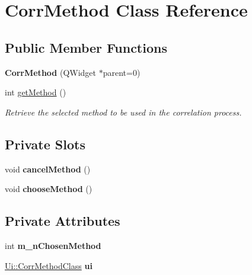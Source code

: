 \hypertarget{classCorrMethod}{
\section{CorrMethod Class Reference}
\label{classCorrMethod}
}
\subsection*{Public Member Functions}
\begin{DoxyCompactItemize}
\item 
\hypertarget{classCorrMethod_abdc14398267291249d40158e133cf68b}{
{\bfseries CorrMethod} (QWidget $\ast$parent=0)}
\label{classCorrMethod_abdc14398267291249d40158e133cf68b}

\item 
int \hyperlink{classCorrMethod_a3eeafdd901560c1fa92be75d4ed58872}{getMethod} ()
\begin{DoxyCompactList}\small\item\em Retrieve the selected method to be used in the correlation process. \item\end{DoxyCompactList}\end{DoxyCompactItemize}
\subsection*{Private Slots}
\begin{DoxyCompactItemize}
\item 
\hypertarget{classCorrMethod_a87e628d7ef6facc9a402880d7e01ea36}{
void {\bfseries cancelMethod} ()}
\label{classCorrMethod_a87e628d7ef6facc9a402880d7e01ea36}

\item 
\hypertarget{classCorrMethod_a7522197ac15c7563aee8d15d0cff3d95}{
void {\bfseries chooseMethod} ()}
\label{classCorrMethod_a7522197ac15c7563aee8d15d0cff3d95}

\end{DoxyCompactItemize}
\subsection*{Private Attributes}
\begin{DoxyCompactItemize}
\item 
\hypertarget{classCorrMethod_a3e64e1a2c9eabff57b7e58eaff13f45f}{
int {\bfseries m\_\-nChosenMethod}}
\label{classCorrMethod_a3e64e1a2c9eabff57b7e58eaff13f45f}

\item 
\hypertarget{classCorrMethod_a866bb1b72235d777ca96a6ce9701f9f6}{
\hyperlink{classUi_1_1CorrMethodClass}{Ui::CorrMethodClass} {\bfseries ui}}
\label{classCorrMethod_a866bb1b72235d777ca96a6ce9701f9f6}

\end{DoxyCompactItemize}


